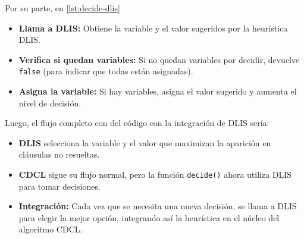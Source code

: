 Por su parte, en \ref{lst:decide-dlis}
\begin{itemize}
    \item \textbf{Llama a DLIS:} Obtiene la variable y el valor sugeridos por la heurística DLIS.
    \item \textbf{Verifica si quedan variables:} Si no quedan variables por decidir, devuelve \texttt{false} (para indicar que todas están asignadas).
    \item \textbf{Asigna la variable:} Si hay variables, asigna el valor sugerido y aumenta el nivel de decisión.
\end{itemize}

Luego, el flujo completo con del c\'odigo con la integraci\'on de DLIS ser\'ia:

\begin{itemize}
    \item \textbf{DLIS} selecciona la variable y el valor que maximizan la aparición en cláusulas no resueltas.
    \item \textbf{CDCL} sigue su flujo normal, pero la función \texttt{decide()} ahora utiliza DLIS para tomar decisiones.
    \item \textbf{Integración:} Cada vez que se necesita una nueva decisión, se llama a DLIS para elegir la mejor opción, integrando así la heurística en el núcleo del algoritmo CDCL.
\end{itemize}





